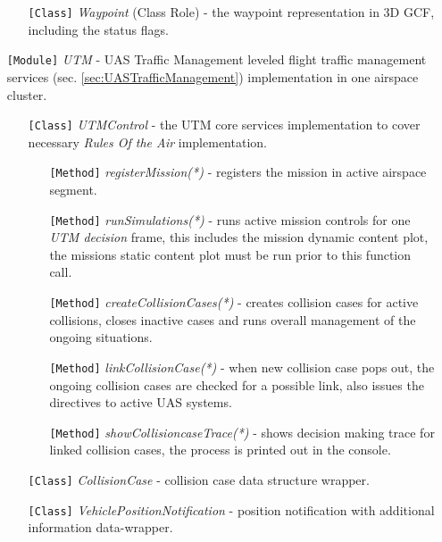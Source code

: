 \begin{itemize}
\begin{itemize}
        \item[\texttt{[Class]}] \emph{Waypoint} (Class Role) - the waypoint representation in 3D GCF, including the status flags. 
    \end{itemize}
    
    \item[\texttt{[Module]}] \emph{UTM} - UAS Traffic Management leveled flight traffic management services (sec. \ref{sec:UASTrafficManagement}) implementation in one airspace cluster.
    \begin{itemize}
        \item[\texttt{[Class]}] \emph{UTMControl} - the UTM core services implementation to cover necessary \emph{Rules Of the Air} implementation.
        \begin{itemize}
            \item[\texttt{[Method]}] \emph{registerMission(*)} - registers the mission in active airspace segment.
            
            \item[\texttt{[Method]}] \emph{runSimulations(*)} - runs active mission controls for one \emph{UTM decision} frame, this includes the mission dynamic content plot, the missions static content plot must be run prior to this function call.
            
            \item[\texttt{[Method]}] \emph{createCollisionCases(*)} - creates collision cases for active collisions, closes inactive cases and runs overall management of the ongoing situations.
            
            \item[\texttt{[Method]}] \emph{linkCollisionCase(*)} - when new collision case pops out, the ongoing collision cases are checked for a possible link, also issues the directives to active UAS systems.
            
            \item[\texttt{[Method]}] \emph{showCollisioncaseTrace(*)} - shows decision making trace for linked collision cases, the process is printed out in the console.
        \end{itemize}
        
        \item[\texttt{[Class]}] \emph{CollisionCase} - collision case data structure wrapper.
        
        \item[\texttt{[Class]}] \emph{VehiclePositionNotification} - position notification with additional information data-wrapper.
    \end{itemize}
    

\end{itemize}
